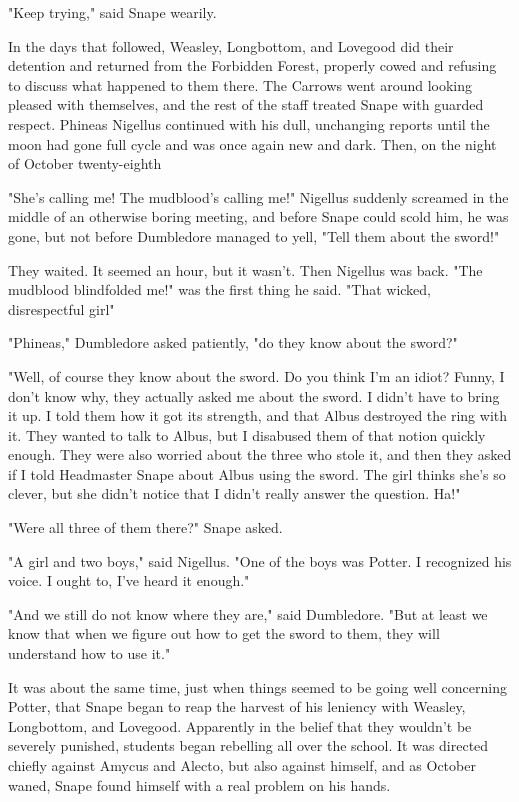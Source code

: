 "Keep trying," said Snape wearily.

In the days that followed, Weasley, Longbottom, and Lovegood did their detention and returned from the Forbidden Forest, properly cowed and refusing to discuss what happened to them there. The Carrows went around looking pleased with themselves, and the rest of the staff treated Snape with guarded respect. Phineas Nigellus continued with his dull, unchanging reports until the moon had gone full cycle and was once again new and dark. Then, on the night of October twenty-eighth{\el}

"She's calling me! The mudblood's calling me!" Nigellus suddenly screamed in the middle of an otherwise boring meeting, and before Snape could scold him, he was gone, but not before Dumbledore managed to yell, "Tell them about the sword!"

They waited. It seemed an hour, but it wasn't. Then Nigellus was back. "The mudblood blindfolded me!" was the first thing he said. "That wicked, disrespectful girl{\el}"

"Phineas," Dumbledore asked patiently, "do they know about the sword?"

"Well, of course they know about the sword. Do you think I'm an idiot? Funny, I don't know why, they actually asked me about the sword. I didn't have to bring it up. I told them how it got its strength, and that Albus destroyed the ring with it. They wanted to talk to Albus, but I disabused them of that notion quickly enough. They were also worried about the three who stole it, and then they asked if I told Headmaster Snape about Albus using the sword. The girl thinks she's so clever, but she didn't notice that I didn't really answer the question. Ha!"

"Were all three of them there?" Snape asked.

"A girl and two boys," said Nigellus. "One of the boys was Potter. I recognized his voice. I ought to, I've heard it enough."

"And we still do not know where they are," said Dumbledore. "But at least we know that when we figure out how to get the sword to them, they will understand how to use it."

It was about the same time, just when things seemed to be going well concerning Potter, that Snape began to reap the harvest of his leniency with Weasley, Longbottom, and Lovegood. Apparently in the belief that they wouldn't be severely punished, students began rebelling all over the school. It was directed chiefly against Amycus and Alecto, but also against himself, and as October waned, Snape found himself with a real problem on his hands.

